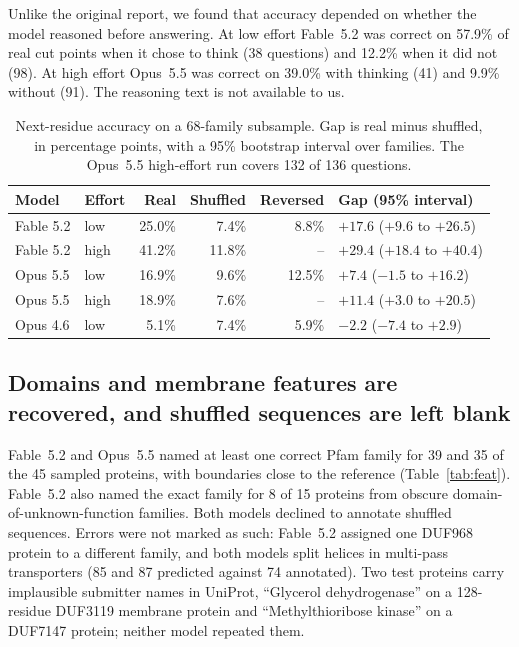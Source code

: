 \documentclass[11pt]{article}
\begin{document}
Unlike the original report, we found that accuracy depended on whether the model reasoned before
answering. At low effort Fable~5.2 was correct on 57.9\% of real cut points when it chose to think (38
questions) and 12.2\% when it did not (98). At high effort Opus~5.5 was correct on 39.0\% with thinking
(41) and 9.9\% without (91). The reasoning text is not available to us.

\begin{table}[ht]
\centering\small
\caption{Next-residue accuracy on a 68-family subsample. Gap is real minus shuffled, in percentage points,
with a 95\% bootstrap interval over families. The Opus~5.5 high-effort run covers 132 of 136 questions.}
\label{tab:next}
\begin{tabular}{llrrrl}
\toprule
Model & Effort & Real & Shuffled & Reversed & Gap (95\% interval) \\
\midrule
Fable 5.2 & low & 25.0\% & 7.4\% & 8.8\% & $+17.6$ ($+9.6$ to $+26.5$) \\
Fable 5.2 & high & 41.2\% & 11.8\% & -- & $+29.4$ ($+18.4$ to $+40.4$) \\
Opus 5.5 & low & 16.9\% & 9.6\% & 12.5\% & $+7.4$ ($-1.5$ to $+16.2$) \\
Opus 5.5 & high & 18.9\% & 7.6\% & -- & $+11.4$ ($+3.0$ to $+20.5$) \\
Opus 4.6 & low & 5.1\% & 7.4\% & 5.9\% & $-2.2$ ($-7.4$ to $+2.9$) \\
\bottomrule
\end{tabular}
\end{table}

\subsection{Domains and membrane features are recovered, and shuffled sequences are left blank}

Fable~5.2 and Opus~5.5 named at least one correct Pfam family for 39 and 35 of the 45 sampled proteins,
with boundaries close to the reference (Table~\ref{tab:feat}). Fable~5.2 also named the exact family for 8
of 15 proteins from obscure domain-of-unknown-function families. Both models declined to annotate
shuffled sequences. Errors were not marked as such: Fable~5.2 assigned one DUF968 protein to a different
family, and both models split helices in multi-pass transporters (85 and 87 predicted against 74
annotated). Two test proteins carry implausible submitter names in UniProt, ``Glycerol dehydrogenase'' on
a 128-residue DUF3119 membrane protein and ``Methylthioribose kinase'' on a DUF7147 protein; neither model
repeated them.
\end{document}
